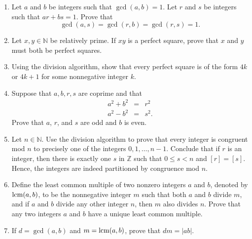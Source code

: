 {\begin{enumerate}
\begin{enumerate}
 \item
Prove that $f_n = [(1 + \sqrt{5}\, )^n - (1 - \sqrt{5}\, )^n]/ 2^n \sqrt{5}$.
 
 \item
Show that $\lim_{n \rightarrow \infty} f_n / f_{n + 1} = (\sqrt{5} - 1)/2$. 
 
 \item
Prove that $f_n$ and $f_{n + 1}$ are relatively prime.
 
\end{enumerate}

\item
Let $a$ and $b$ be integers such that $\gcd(a,b) = 1$.  Let $r$ and $s$ be integers such that $ar + bs =1$.  Prove that 
$$
\gcd(a,s) = \gcd(r,b) = \gcd(r,s) =  1.
$$

\item
Let $x, y \in {\mathbb N}$ be relatively prime.  If $xy$ is a perfect square, prove that $x$ and $y$ must both be perfect squares.

\item
Using the division algorithm, show that every perfect square is of the form $4k$ or $4k + 1$ for some nonnegative integer $k$.

\item
Suppose that $a, b, r, s$ are coprime and that
\begin{eqnarray*}
a^2 + b^2 &=& r^2 \\
a^2 - b^2 &=& s^2.
\end{eqnarray*}
Prove that $a$, $r$, and $s$ are odd and $b$ is even.
 
\item
Let $n \in {\mathbb N}$.  Use the division algorithm to prove that every integer is congruent mod $n$ to precisely one of the integers $0, 1, \ldots, n-1$.  Conclude that if $r$ is an integer, then there is exactly one $s$ in ${\mathbb Z}$ such that $0 \leq s < n$ and $[r] = [s]$.   Hence, the integers are indeed partitioned by congruence mod $n$. 

\item
Define the {\bfi least common multiple\/} of two nonzero integers $a$ and $b$, denoted by $\operatorname{lcm}(a,b)$\label{leastcm}, to be the nonnegative integer $m$ such that both $a$ and $b$ divide $m$, and if $a$ and $b$  divide any other integer $n$, then $m$ also divides $n$.  Prove that any two integers $a$ and $b$ have a unique least common multiple. 

\item
If $d= \gcd(a, b)$ and $m = \operatorname{lcm}(a, b)$, prove that $dm = |ab|$.


\end{enumerate}}
